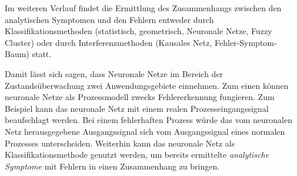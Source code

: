 Im weiteren Verlauf findet die Ermittlung des Zusammenhangs zwischen den analytischen Symptomen und den Fehlern entweder durch Klassifikationsmethoden (statistisch, geometrisch, Neuronale Netze, Fuzzy Cluster) oder durch Interferenzmethoden (Kausales Netz, Fehler-Symptom-Baum) statt. \cite{Isermann.2010}
 
Damit lässt sich sagen, dass Neuronale Netze im Bereich der Zustandsüberwachung zwei Anwendungsgebiete einnehmen. Zum einen können neuronale Netze als Prozessmodell zwecks Fehlererkennung fungieren. Zum Beispiel kann das neuronale Netz mit einem realen Prozesseingangssignal beaufschlagt werden. Bei einem fehlerhaften Prozess würde das vom neuronalen Netz herausgegebene Ausgangssignal sich vom  Ausgangssignal eines normalen Prozesses unterscheiden. Weiterhin kann das neuronale Netz als Klassifikationsmethode genutzt werden, um bereits ermittelte \textit{analytische Symptome} mit Fehlern in einen Zusammenhang zu bringen.  




 